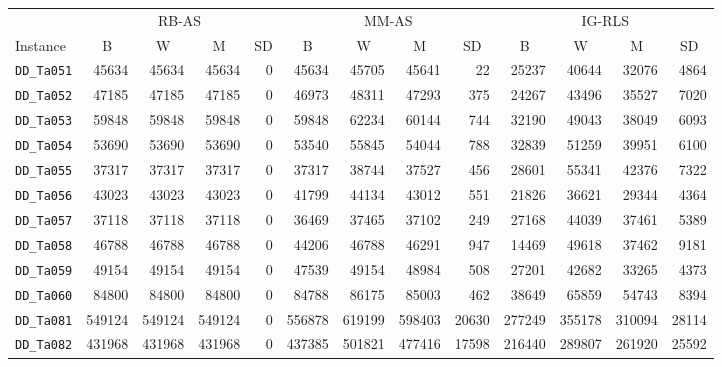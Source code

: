\documentclass[runningheads]{llncs}
\begin{document}
\begin{table}
	\centering
	\begin{tabular}{lrrrrrrrrrrrr}
		\toprule
		& \multicolumn{4}{c}{RB-AS} & \multicolumn{4}{c}{MM-AS} & \multicolumn{4}{c}{IG-RLS}\\
		\cmidrule(r){2-5} \cmidrule(r){6-9} \cmidrule(r){10-13}
		Instance & \multicolumn{1}{c}{B} & \multicolumn{1}{c}{W} &
		\multicolumn{1}{c}{M} & \multicolumn{1}{c}{SD} & \multicolumn{1}{c}{B} &
		\multicolumn{1}{c}{W} & \multicolumn{1}{c}{M} & \multicolumn{1}{c}{SD} &
		\multicolumn{1}{c}{B} & \multicolumn{1}{c}{W} & \multicolumn{1}{c}{M} &
		\multicolumn{1}{c}{SD} \\
		\midrule
    	\texttt{DD\_Ta051} & 45634  & 45634  & 45634  &  0 & 45634  & 45705  & 45641  & 22    & 25237  & 40644  & 32076  & 4864  \\
    	\texttt{DD\_Ta052} & 47185  & 47185  & 47185  &  0 & 46973  & 48311  & 47293  & 375   & 24267  & 43496  & 35527  & 7020  \\
    	\texttt{DD\_Ta053} & 59848  & 59848  & 59848  &  0 & 59848  & 62234  & 60144  & 744   & 32190  & 49043  & 38049  & 6093  \\
    	\texttt{DD\_Ta054} & 53690  & 53690  & 53690  &  0 & 53540  & 55845  & 54044  & 788   & 32839  & 51259  & 39951  & 6100  \\
    	\texttt{DD\_Ta055} & 37317  & 37317  & 37317  &  0 & 37317  & 38744  & 37527  & 456   & 28601  & 55341  & 42376  & 7322  \\
    	\texttt{DD\_Ta056} & 43023  & 43023  & 43023  &  0 & 41799  & 44134  & 43012  & 551   & 21826  & 36621  & 29344  & 4364  \\
    	\texttt{DD\_Ta057} & 37118  & 37118  & 37118  &  0 & 36469  & 37465  & 37102  & 249   & 27168  & 44039  & 37461  & 5389  \\
    	\texttt{DD\_Ta058} & 46788  & 46788  & 46788  &  0 & 44206  & 46788  & 46291  & 947   & 14469  & 49618  & 37462  & 9181  \\
    	\texttt{DD\_Ta059} & 49154  & 49154  & 49154  &  0 & 47539  & 49154  & 48984  & 508   & 27201  & 42682  & 33265  & 4373  \\
    	\texttt{DD\_Ta060} & 84800  & 84800  & 84800  &  0 & 84788  & 86175  & 85003  & 462   & 38649  & 65859  & 54743  & 8394  \\
    	\texttt{DD\_Ta081} & 549124 & 549124 & 549124 &  0 & 556878 & 619199 & 598403 & 20630 & 277249 & 355178 & 310094 & 28114 \\
    	\texttt{DD\_Ta082} & 431968 & 431968 & 431968 &  0 & 437385 & 501821 & 477416 & 17598 & 216440 & 289807 & 261920 & 25592 \\

\end{tabular}
\end{table}
\end{document}
